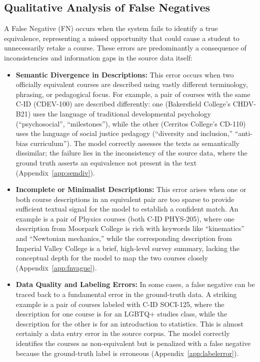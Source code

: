 \subsection{Qualitative Analysis of False Negatives}\label{ch:4.6.3}
A False Negative (FN) occurs when the system fails to identify a true equivalence, representing a missed opportunity that could cause a student to unnecessarily retake a course. These errors are predominantly a consequence of inconsistencies and information gaps in the source data itself:
\begin{itemize}
    \item \textbf{Semantic Divergence in Descriptions:} This error occurs when two officially equivalent courses are described using vastly different terminology, phrasing, or pedagogical focus. For example, a pair of courses with the same C-ID (CDEV-100) are described differently: one (Bakersfield College's CHDV-B21) uses the language of traditional developmental psychology (``psychosocial'', ``milestones''), while the other (Cerritos College's CD-110) uses the language of social justice pedagogy (``diversity and inclusion,'' ``anti-bias curriculum''). The model correctly assesses the texts as semantically dissimilar; the failure lies in the inconsistency of the source data, where the ground truth asserts an equivalence not present in the text (Appendix~\ref{app:semdiv}).
    \item \textbf{Incomplete or Minimalist Descriptions:} This error arises when one or both course descriptions in an equivalent pair are too sparse to provide sufficient textual signal for the model to establish a confident match. An example is a pair of Physics courses (both C-ID PHYS-205), where one description from Moorpark College is rich with keywords like ``kinematics'' and ``Newtonian mechanics,'' while the corresponding description from Imperial Valley College is a brief, high-level survey summary, lacking the conceptual depth for the model to map the two courses closely (Appendix~\ref{app:fnvague}).
    \item \textbf{Data Quality and Labeling Errors:} In some cases, a false negative can be traced back to a fundamental error in the ground-truth data. A striking example is a pair of courses labeled with C-ID SOCI-125, where the description for one course is for an LGBTQ+ studies class, while the description for the other is for an introduction to statistics. This is almost certainly a data entry error in the source corpus. The model correctly identifies the courses as non-equivalent but is penalized with a false negative because the ground-truth label is erroneous (Appendix~\ref{app:labelerror}).
\end{itemize}

